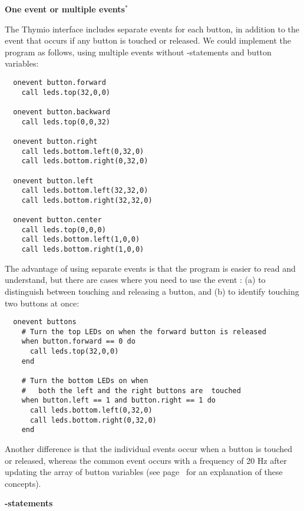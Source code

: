 \textbf{\large One event or multiple events$^*$}

The Thymio interface includes separate events for each button, in
addition to the  event that occurs if any button is touched
or released. We could implement the program as follows, using multiple
events without -statements and button variables:

\begin{footnotesize}
\begin{verbatim}
  onevent button.forward
    call leds.top(32,0,0)
  
  onevent button.backward
    call leds.top(0,0,32)
  
  onevent button.right
    call leds.bottom.left(0,32,0)
    call leds.bottom.right(0,32,0)
  
  onevent button.left
    call leds.bottom.left(32,32,0)
    call leds.bottom.right(32,32,0)
  
  onevent button.center
    call leds.top(0,0,0)
    call leds.bottom.left(1,0,0)
    call leds.bottom.right(1,0,0)
\end{verbatim}
\end{footnotesize}

The advantage of using separate events is that the program is easier to
read and understand, but there are cases where you need to use the event
: (a) to distinguish between touching and releasing a button,
and (b) to identify touching two buttons at once:

\begin{footnotesize}
\begin{verbatim}
  onevent buttons
    # Turn the top LEDs on when the forward button is released
    when button.forward == 0 do
      call leds.top(32,0,0)
    end

    # Turn the bottom LEDs on when
    #   both the left and the right buttons are  touched
    when button.left == 1 and button.right == 1 do
      call leds.bottom.left(0,32,0)
      call leds.bottom.right(0,32,0)
    end
\end{verbatim}
\end{footnotesize}


Another difference is that the individual events occur when a button is
touched or released, whereas the common event  occurs with a
frequency of 20 Hz after updating the array of button variables (see
page~\pageref{pg.hz} for an explanation of these concepts).


\textbf{\large {}-statements}\label{p.if-when}

